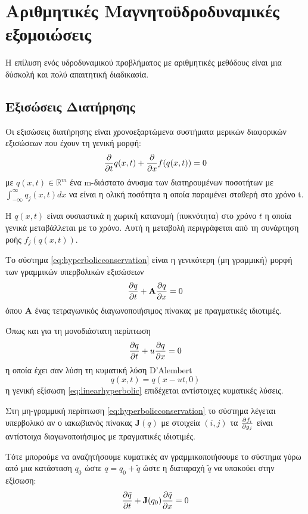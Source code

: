 \documentclass[article,a4paper,11.2pt]{memoir}
\numberwithin{equation}{subsection}
\begin{document}
\section{Αριθμητικές Μαγνητοϋδροδυναμικές εξομοιώσεις}
Η επίλυση ενός υδροδυναμικού προβλήματος με αριθμητικές μεθόδους είναι μια δύσκολή και πολύ απαιτητική διαδικασία. 

\subsection{Εξισώσεις Διατήρησης}
Οι εξισώσεις διατήρησης είναι χρονοεξαρτώμενα συστήματα μερικών διαφορικών εξισώσεων που έχουν τη γενική μορφή:
\begin{equation}
\label{eq:hyperbolicconservation}
\pdv{t} q(x,t) + \pdv{x} f(q(x,t)) = 0 
\end{equation}
με $q(x,t) \in \mathbb{R}^m$ ένα m-διάστατο άνυσμα των διατηρουμένων ποσοτήτων με  $\int_{-\infty}^{\infty} q_j (x,t) dx$ να είναι η ολική ποσότητα η οποία παραμένει σταθερή στο χρόνο t. 

Η $q(x,t)$ είναι ουσιαστικά η χωρική κατανομή (πυκνότητα) στο χρόνο $t$ η οποία γενικά μεταβάλλεται με το χρόνο.
Αυτή η μεταβολή περιγράφεται από τη συνάρτηση ροής $f_j(q(x,t))$. 
 
Το σύστημα \ref{eq:hyperbolicconservation} είναι η γενικότερη (μη γραμμική) μορφή των γραμμικών υπερβολικών εξισώσεων 
\begin{equation}
\label{eq:linearhyperbolic}
\pdv{q}{t} +  \mathbf{A}\pdv{q}{x}  = 0 
\end{equation}
όπου $\mathbf{A}$ ένας τετραγωνικός διαγωνοποιήσιμος πίνακας με πραγματικές ιδιοτιμές.

Όπως και για τη μονοδιάστατη  περίπτωση 
\begin{equation}
\label{eq:simple_advection}
\pdv{q}{t} +  u\pdv{q}{x}  = 0 
\end{equation}
η οποία έχει σαν λύση τη κυματική λύση D'Alembert
\begin{equation}
q(x,t)=q(x-ut,0)
\end{equation}
η γενική εξίσωση \ref{eq:linearhyperbolic} επιδέχεται αντίστοιχες κυματικές λύσεις.

Στη μη-γραμμική περίπτωση \ref{eq:hyperbolicconservation} το σύστημα λέγεται υπερβολικό αν ο ιακωβιανός πίνακας $\mathbf{J}(q)$ με στοιχεία $(i,j)$ τα $\pdv{f_i}{g_j}$ είναι αντίστοιχα διαγωνοποιήσιμος με πραγματικές ιδιοτιμές.

Τότε μπορούμε να αναζητήσουμε κυματικές αν γραμμικοποιήσουμε το σύστημα γύρω από μια κατάσταση $q_0$ ώστε $q=q_0+\tilde{q}$ ώστε η διαταραχή $\tilde{q}$ να υπακούει στην εξίσωση:
\begin{equation}
\pdv{\tilde{q}}{t} + \mathbf{J}(q_0) \pdv{\tilde{q}}{x} = 0 
\end{equation}
\end{document}
